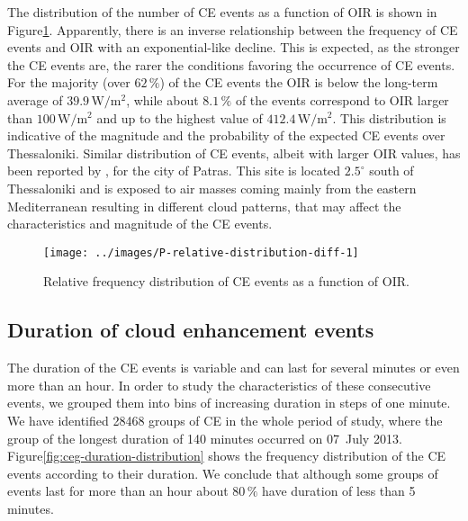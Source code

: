 \documentclass[preprint, 5p,
authoryear]{elsarticle} %
\begin{document}
The distribution of the number of CE events as a function of OIR is
shown in Figure\nobreakspace{}\ref{fig:ovir-distribution}. Apparently,
there is an inverse relationship between the frequency of CE events and
OIR with an exponential-like decline. This is expected, as the stronger
the CE events are, the rarer the conditions favoring the occurrence of
CE events. For the majority (over \(62\,\%\)) of the CE events the OIR
is below the long-term average of \(39.9 \, \text{W} / \text{m}^2\),
while about \(8.1\,\%\) of the events correspond to OIR larger than
\(100\,\text{W}/\text{m}^2\) and up to the highest value of
\(412.4\,\text{W}/\text{m}^2\). This distribution is indicative of the
magnitude and the probability of the expected CE events over
Thessaloniki. Similar distribution of CE events, albeit with larger OIR
values, has been reported by \citet{Vamvakas2020}, for the city of
Patras. This site is located \(2.5^\circ\) south of Thessaloniki and is
exposed to air masses coming mainly from the eastern Mediterranean
resulting in different cloud patterns, that may affect the
characteristics and magnitude of the CE events.

\begin{figure}

{\centering \texttt{[image: ../images/P-relative-distribution-diff-1]} 

}

\caption{Relative frequency distribution of CE events as a function of OIR.}\label{fig:ovir-distribution}
\end{figure}

\subsection{Duration of cloud enhancement
events}\label{duration-of-cloud-enhancement-events}

The duration of the CE events is variable and can last for several
minutes or even more than an hour. In order to study the characteristics
of these consecutive events, we grouped them into bins of increasing
duration in steps of one minute. We have identified 28468 groups of CE
in the whole period of study, where the group of the longest duration of
140 minutes occurred on 07~July 2013.
Figure\nobreakspace{}\ref{fig:ceg-duration-distribution} shows the
frequency distribution of the CE events according to their duration. We
conclude that although some groups of events last for more than an hour
about \(80\,\%\) have duration of less than 5 minutes.
\end{document}
